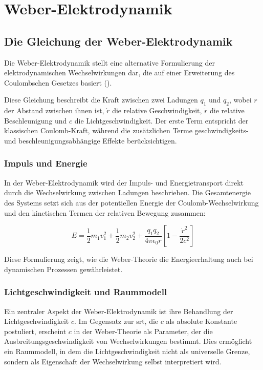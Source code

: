\chapter{Weber-Elektrodynamik}
\section{Die Gleichung der Weber-Elektrodynamik}
Die Weber-Elektrodynamik stellt eine alternative Formulierung der elektrodynamischen Wechselwirkungen dar, die auf einer Erweiterung des Coulombschen Gesetzes basiert ().

Diese Gleichung beschreibt die Kraft zwischen zwei Ladungen $q_1$ und $q_2$, wobei $r$ der Abstand zwischen ihnen ist, $\dot{r}$ die relative Geschwindigkeit, $\ddot{r}$ die relative
Beschleunigung und $c$ die Lichtgeschwindigkeit. Der erste Term entspricht der klassischen Coulomb-Kraft, während die zusätzlichen Terme geschwindigkeits- und beschleunigungsabhängige
Effekte berücksichtigen.

\subsection{Impuls und Energie}
In der Weber-Elektrodynamik wird der Impuls- und Energietransport direkt durch die Wechselwirkung zwischen Ladungen beschrieben. Die Gesamtenergie des Systems setzt sich aus der potentiellen
Energie der Coulomb-Wechselwirkung und den kinetischen Termen der relativen Bewegung zusammen:

\[
    E = \frac{1}{2} m_1 v_1^2 + \frac{1}{2} m_2 v_2^2 + \frac{q_1 q_2}{4 \pi \epsilon_0 r} \left[ 1 - \frac{\dot{r}^2}{2c^2} \right]
\]

Diese Formulierung zeigt, wie die Weber-Theorie die Energieerhaltung auch bei dynamischen Prozessen gewährleistet.

\subsection{Lichtgeschwindigkeit und Raummodell}
Ein zentraler Aspekt der Weber-Elektrodynamik ist ihre Behandlung der Lichtgeschwindigkeit $c$. Im Gegensatz zur \gls{srt}, die $c$ als absolute Konstante postuliert,
erscheint $c$ in der Weber-Theorie als Parameter, der die Ausbreitungsgeschwindigkeit von Wechselwirkungen bestimmt. Dies ermöglicht ein Raummodell, in dem die Lichtgeschwindigkeit
nicht als universelle Grenze, sondern als Eigenschaft der Wechselwirkung selbst interpretiert wird.

